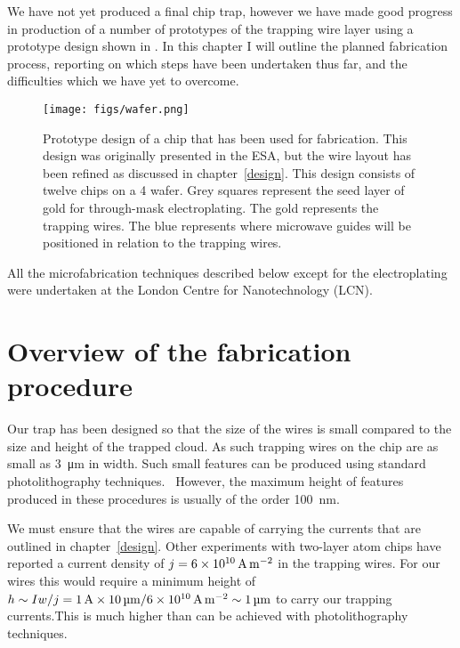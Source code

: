 We have not yet produced a final chip trap, however we have made good progress
in production of a number of prototypes of the trapping wire layer using a
prototype design shown in . In this chapter I will
outline the planned fabrication process, reporting on which steps have been
undertaken thus far, and the difficulties which we have yet to overcome.

\begin{figure}[h]
\vspace{0.8cm}
\centering
  \texttt{[image: figs/wafer.png]}
  \caption{
    Prototype design of a chip that has been used for fabrication. This design
    was originally presented in the ESA, but the wire layout has been refined as
    discussed in chapter~\ref{design}. This design consists of twelve chips on
    a \SI{4}{\inch} wafer. Grey squares represent the seed layer of gold for
    through-mask electroplating. The gold represents the trapping wires. The
    blue represents where microwave guides will be positioned in relation to
    the trapping wires.
  }
  \label{fab:fig:design1}
\end{figure}

All the microfabrication techniques described below except for the
electroplating were undertaken at the London Centre for Nanotechnology (LCN). 

\section{Overview of the fabrication procedure}

Our trap has been designed so that the size of the wires is small compared to
the size and height of the trapped cloud. As such trapping wires on the chip
are as small as \SI{3}{\micro\meter} in width. Such small features can be
produced using standard photolithography techniques.~\cite{Madou2002} However,
the maximum height of features produced in these procedures is usually of the
order \SI{100}{\nano\meter}.

We must ensure that the wires are capable of carrying the currents that are
outlined in chapter~\ref{design}.  Other experiments with two-layer atom chips
have reported a current density of $j=\SI{6E10}{\ampere\per\meter\squared}$ in
the trapping wires. For our wires this would require a minimum height of $h
\sim I w/j = \SI{1}{\ampere} \times
\SI{10}{\micro\meter}/\SI{6E10}{\ampere\per\meter\squared} \sim
\SI{1}{\micro\meter}$  to carry our trapping currents.This is much higher than
can be achieved with photolithography techniques.

